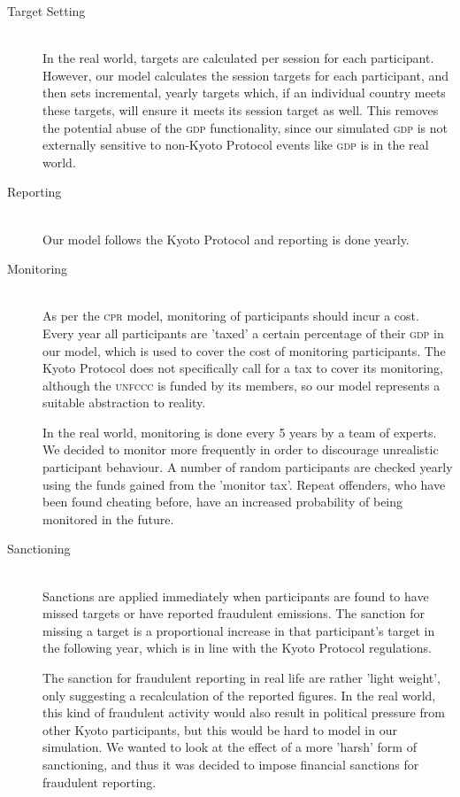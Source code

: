 \begin{description}
	\item [Target Setting] \hfill \\ In the real world, targets are calculated per session for each participant. However, our model calculates the session targets for each participant, and then sets incremental, yearly targets which, if an individual country meets these targets, will ensure it meets its session target as well. This removes the potential abuse of the \textsc{gdp} functionality, since our simulated \textsc{gdp} is not externally sensitive to non-Kyoto Protocol events like \textsc{gdp} is in the real world.
	\item [Reporting] \hfill \\ Our model follows the Kyoto Protocol and reporting is done yearly.
	\item [Monitoring] \hfill \\ As per the \textsc{cpr} model, monitoring of participants should incur a cost. Every year all participants are 'taxed' a certain percentage of their \textsc{gdp} in our model, which is used to cover the cost of monitoring participants. The Kyoto Protocol does not specifically call for a tax to cover its monitoring, although the \textsc{unfccc} is funded by its members, so our model represents a suitable abstraction to reality.

In the real world, monitoring is done every 5 years by a team of experts. We decided to monitor more frequently in order to discourage unrealistic participant behaviour. A number of random participants are checked yearly using the funds gained from the 'monitor tax'. Repeat offenders, who have been found cheating before, have an increased probability of being monitored in the future.
	\item [Sanctioning] \hfill \\ Sanctions are applied immediately when participants are found to have missed targets or have reported fraudulent emissions. The sanction for missing a target is a proportional increase in that participant's target in the following year, which is in line with the Kyoto Protocol regulations.

The sanction for fraudulent reporting in real life are rather 'light weight', only suggesting a recalculation of the reported figures. In the real world, this kind of fraudulent activity would also result in political pressure from other Kyoto participants, but this would be hard to model in our simulation. We wanted to look at the effect of a more 'harsh' form of sanctioning, and thus it was decided to impose financial sanctions for fraudulent reporting.
\end{description}

